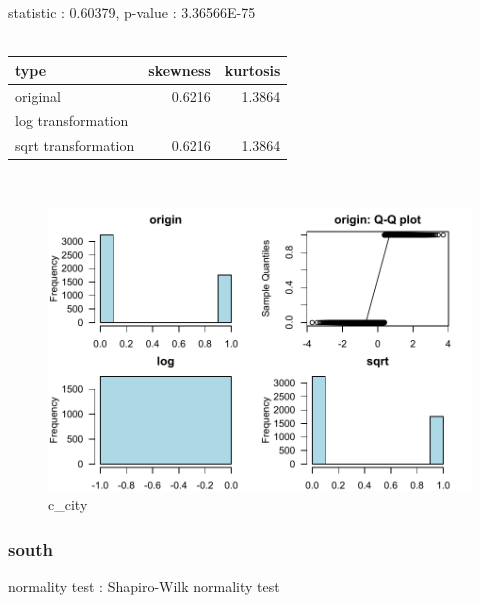 \documentclass{book}\usepackage[]{graphicx}\usepackage[]{color}
\begin{document}
\noindent statistic : 0.60379,  p-value : 3.36566E-75\\
\\%
\begin{tabular}{lrr}
  \toprule
type & skewness & kurtosis \\ 
  \midrule
original & 0.6216 & 1.3864 \\ 
  log transformation &  &  \\ 
  sqrt transformation & 0.6216 & 1.3864 \\ 
   \bottomrule
\end{tabular}
\\
\begin{figure}[!ht]
\centering
\includegraphics[width=1.0\textwidth]{figure/norm11.pdf}
\caption{c\_city}
\end{figure}
\clearpage
\subsubsection{ south }

normality test : Shapiro-Wilk normality test
\end{document}
